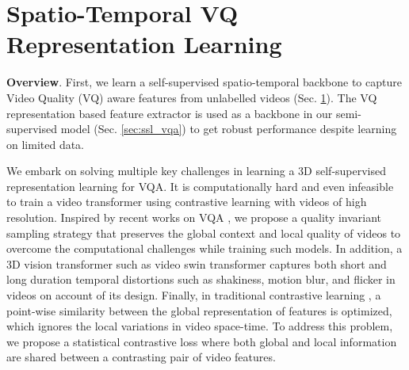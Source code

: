 \documentclass[10pt,twocolumn,letterpaper]{article}
\begin{document}
\section{Spatio-Temporal VQ Representation Learning} \label{sec:stvqrl}

\textbf{Overview}. 
First, we learn a self-supervised spatio-temporal backbone to capture Video Quality (VQ) aware features  from unlabelled videos (Sec. \ref{sec:stvqrl}). The VQ representation based feature extractor is used as a backbone in our semi-supervised model (Sec. \ref{sec:ssl_vqa}) to get robust performance despite learning on limited data. 

We embark on solving multiple key challenges in learning a 3D self-supervised representation learning for VQA. It is computationally hard and even infeasible to train a video transformer using contrastive learning with videos of high resolution. Inspired by recent works on VQA \cite{fastVQA, maxVQA}, we propose a quality invariant sampling strategy that preserves the global context and local quality of videos to overcome the computational challenges while training such models. In addition, a 3D vision transformer such as video swin transformer \cite{video_swin_t} captures both short and long duration temporal distortions such as shakiness, motion blur, and flicker in videos on account of its design. Finally, in traditional contrastive learning \cite{simclr,cmc, iic_ssl}, a point-wise similarity between the global representation of features is optimized, which ignores the local variations in video space-time. To address this problem, we propose a statistical contrastive loss where both global and local information are shared between a contrasting pair of video features.
\end{document}
